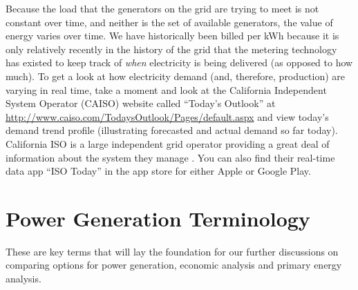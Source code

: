 \documentclass[10pt]{article}
\begin{document}
Because the load that the generators on the grid are trying to meet is not constant over time, and neither is the set of available generators, the value of energy varies over time. We have historically been billed per kWh because it is only relatively recently in the history of the grid that the metering technology has existed to keep track of \textit{when} electricity is being delivered (as opposed to how much). To get a look at how electricity demand (and, therefore, production) are varying in real time, take a moment and look at the California Independent System Operator (CAISO) website called ``Today's Outlook'' at \url{http://www.caiso.com/TodaysOutlook/Pages/default.aspx} and view today's demand trend profile (illustrating forecasted and actual demand so far today). California ISO is a large independent grid operator providing a great deal of information about the system they manage \cite{CAISO}. You can also find their real-time data app ``ISO Today'' in the app store for either Apple or Google Play.




\section{Power Generation Terminology}

These are key terms that will lay the foundation for our further discussions on comparing options for power generation, economic analysis and primary energy analysis.
\end{document}
